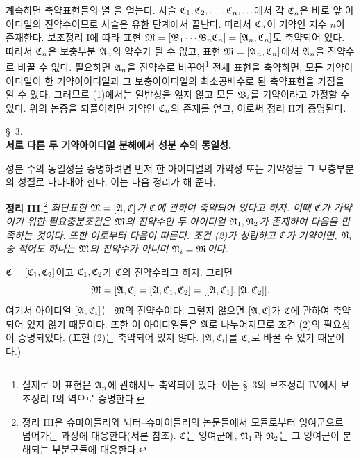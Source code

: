 계속하면 축약표현들의 열
을 얻는다. 사슬 $\mathfrak{C}_1,\mathfrak{C}_2,\ldots,\mathfrak{C}_n,\ldots$에서 각 $\mathfrak{C}_n$은 바로 앞 아이디얼의 진약수이므로 사슬은 유한 단계에서 끝난다. 따라서 $\mathfrak{C}_n$이 기약인 지수 $n$이 존재한다. 보조정리 I에 따라 표현 $\mathfrak{M}=[\mathfrak{B}_1\cdots\mathfrak{B}_n\mathfrak{C}_n]=[\mathfrak{A}_n,\mathfrak{C}_n]$도 축약되어 있다. 따라서 $\mathfrak{C}_n$은 보충부분 $\mathfrak{A}_n$의 약수가 될 수 없고, 표현 $\mathfrak{M}=[\mathfrak{A}_n,\mathfrak{C}_n]$에서 $\mathfrak{A}_n$을 진약수로 바꿀 수 없다. 필요하면 $\mathfrak{A}_n$을 진약수로 바꾸어\footnote{실제로 이 표현은 $\mathfrak{A}_n$에 관해서도 축약되어 있다. 이는 \S~3의 보조정리 IV에서 보조정리 I의 역으로 증명한다.} 전체 표현을 축약하면, 모든 가약아이디얼이 한 기약아이디얼과 그 보충아이디얼의 최소공배수로 된 축약표현을 가짐을 알 수 있다. 그러므로 (1)에서는 일반성을 잃지 않고 모든 $\mathfrak{B}_i$를 기약이라고 가정할 수 있다. 위의 논증을 되풀이하면 기약인 $\mathfrak{C}_n$의 존재를 얻고, 이로써 정리 II가 증명된다.

\begin{center}
\S~3.\\[0.25em]
\textbf{서로 다른 두 기약아이디얼 분해에서 성분 수의 동일성.}
\end{center}

성분 수의 동일성을 증명하려면 먼저 한 아이디얼의 가약성 또는 기약성을 그 보충부분의 성질로 나타내야 한다. 이는 다음 정리가 해 준다.

\textbf{정리 III.}\footnote{정리 III은 슈마이들러와 뇌터--슈마이들러의 논문들에서 모듈로부터 잉여군으로 넘어가는 과정에 대응한다(서론 참조). $\mathfrak{C}$는 잉여군에, $\mathfrak{N}_1$과 $\mathfrak{N}_2$는 그 잉여군이 분해되는 부분군들에 대응한다.} \emph{최단표현 $\mathfrak{M}=[\mathfrak{A},\mathfrak{C}]$가 $\mathfrak{C}$에 관하여 축약되어 있다고 하자. 이때 $\mathfrak{C}$가 가약이기 위한 필요충분조건은 $\mathfrak{M}$의 진약수인 두 아이디얼 $\mathfrak{N}_1,\mathfrak{N}_2$가 존재하여 다음을 만족하는 것이다.}
\emph{또한 이로부터 다음이 따른다. 조건 (2)가 성립하고 $\mathfrak{C}$가 기약이면, $\mathfrak{N}_i$ 중 적어도 하나는 $\mathfrak{M}$의 진약수가 아니며 $\mathfrak{N}_i=\mathfrak{M}$이다.}

$\mathfrak{C}=[\mathfrak{C}_1,\mathfrak{C}_2]$이고 $\mathfrak{C}_1,\mathfrak{C}_2$가 $\mathfrak{C}$의 진약수라고 하자. 그러면
\[
 \mathfrak{M}=[\mathfrak{A},\mathfrak{C}]=[\mathfrak{A},\mathfrak{C}_1,\mathfrak{C}_2]
       =[[\mathfrak{A},\mathfrak{C}_1],[\mathfrak{A},\mathfrak{C}_2]].
\]
여기서 아이디얼 $[\mathfrak{A},\mathfrak{C}_i]$는 $\mathfrak{M}$의 진약수이다. 그렇지 않으면 $[\mathfrak{A},\mathfrak{C}]$가 $\mathfrak{C}$에 관하여 축약되어 있지 않기 때문이다. 또한 이 아이디얼들은 $\mathfrak{A}$로 나누어지므로 조건 (2)의 필요성이 증명되었다. (표현 (2)는 축약되어 있지 않다. $[\mathfrak{A},\mathfrak{C}_i]$를 $\mathfrak{C}_i$로 바꿀 수 있기 때문이다.)

